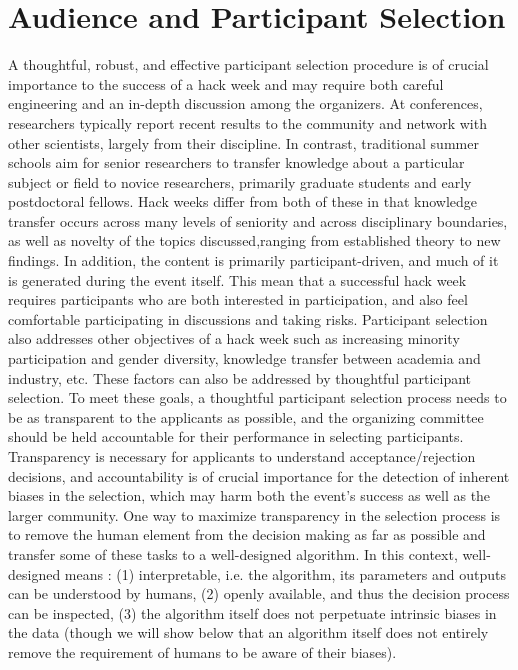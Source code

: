 \section*{Audience and Participant Selection}

A thoughtful, robust, and effective participant selection procedure is of crucial importance to the success of a hack week and may require both careful engineering and an in-depth discussion among the organizers.
At conferences, researchers typically report recent results to the community and network with other scientists, largely from their discipline.
In contrast, traditional summer schools aim for senior researchers to transfer knowledge about a particular subject or field to novice researchers, primarily graduate students and early postdoctoral fellows.
Hack weeks differ from both of these in that knowledge transfer occurs across many levels of seniority and across disciplinary boundaries, as well as novelty of the topics discussed,ranging from established theory to new findings.
In addition, the content is primarily participant-driven, and much of it is generated during the event itself.
This mean that a successful hack week requires participants who are both interested in participation, and also feel comfortable participating in discussions and taking risks.
Participant selection also addresses other objectives of a hack week such as increasing minority participation and gender diversity, knowledge transfer between academia and industry, etc. These factors can also be addressed by thoughtful participant selection.
To meet these goals, a thoughtful participant selection process needs to be as transparent to the applicants as possible, and the organizing committee should be held accountable for their performance in selecting participants.
Transparency is necessary for applicants to understand acceptance/rejection decisions, and accountability is of crucial importance for the detection of inherent biases in the selection, which may harm both the event's success as well as the larger community.
One way to maximize transparency in the selection process is to remove the human element from the decision making as far as possible and transfer some of these tasks to a well-designed algorithm.
In this context, well-designed means \cite{o2017weapons}: (1) interpretable, i.e. the algorithm, its parameters and outputs can be understood by humans, (2) openly available, and thus the decision process can be inspected, (3) the algorithm itself does not perpetuate intrinsic biases in the data (though we will show below that an algorithm itself does not entirely remove the requirement of humans to be aware of their biases).

